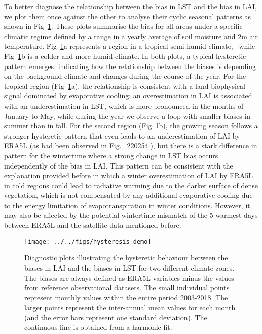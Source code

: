 \documentclass[gmd, manuscript]{copernicus}
\begin{document}
{To better diagnose the relationship between the bias in LST and the bias
in LAI, we plot them once against the other to analyse their cyclic
seasonal patterns as shown in Fig~{\ref{842529}}. These
plots summarise the bias for all areas under a specific climatic regime
defined by a range in a yearly average of soil moisture and 2m air
temperature. Fig~{\ref{842529}}a represents a region in
a tropical semi-humid climate,~ while Fig~{\ref{842529}}b is a colder and 
more humid climate. In both plots, a typical hysteretic pattern emerges, 
indicating how the relationship between the biases is depending on the 
background climate and changes during the course of the year. For the 
tropical region (Fig~{\ref{842529}}a), the relationship is consistent
with a land biophysical signal dominated by evaporative cooling: an
overestimation in LAI is associated with an underestimation in LST,
which is more pronounced in the months of January to May, while during
the year we observe a loop with smaller biases in summer than in fall.
For the second region (Fig~{\ref{842529}}b), the
growing season follows a stronger hysteretic pattern that even leads to
an underestimation of LAI by ERA5L (as had been observed in
Fig.~{\ref{220254}}), but there is a stark difference
in pattern for the wintertime where a strong change in LST bias occurs
independently of the bias in LAI. This pattern can be consistent with the
explanation provided before in which a winter overestimation of LAI by
ERA5L in cold regions could lead to radiative warming due to the darker
surface of dense vegetation, which is not compensated by any additional
evaporative cooling due to the energy limitation of evapotranspiration
in winter conditions. However, it may also be affected by the potential 
wintertime mismatch of the 5 warmest days between ERA5L and the satellite 
data mentioned before.


\par\null{}
\begin{figure}[H]
\begin{center}
\texttt{[image: ../../figs/hysteresis\_demo]}
\caption{{Diagnostic plots illustrating the hysteretic behaviour between the
biases in LAI and the biases in LST for two different climate zones. The
biases are always defined as ERA5L variables minus the values from
reference observational datasets. The small individual points represent
monthly values within the entire period 2003-2018. The larger points
represent the inter-annual mean values for each month (and the error
bars represent one standard deviation). The continuous line is obtained
from a harmonic fit.
{\label{842529}}%
}}
\end{center}
\end{figure}


}
\end{document}
